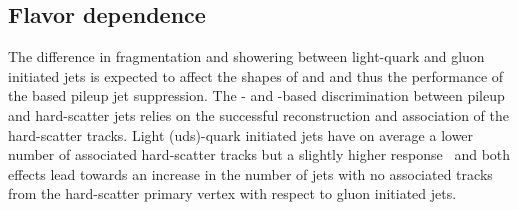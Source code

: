 \documentclass{atlasnote}
\begin{document}


\subsection{Flavor dependence}
The difference in fragmentation and showering between light-quark and gluon initiated jets is expected to affect the shapes of \cJVF and \RpT and 
thus the performance of the \JVT based pileup jet suppression. 
The \cJVF- and \RpT-based discrimination between pileup and hard-scatter jets relies on 
the successful reconstruction and association of the hard-scatter tracks.
Light (uds)-quark initiated jets have on average a lower number of associated hard-scatter tracks but a slightly higher response~\cite{ATLAS-CONF-2012-138} and
both effects lead towards an increase in the number of jets with no associated tracks from the hard-scatter primary vertex with 
respect to gluon initiated jets. 
\end{document}
